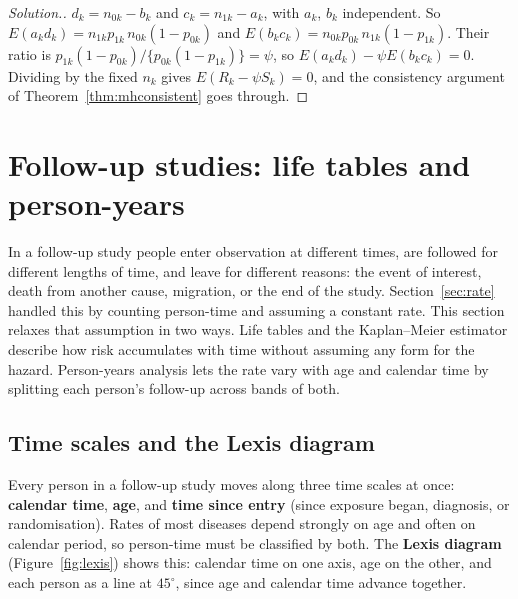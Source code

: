 \documentclass[11pt,a4paper]{article}
\numberwithin{equation}{section}
\theoremstyle{definition}
\newenvironment{solution}
  {\renewcommand{\qedsymbol}{}\begin{proof}[\textit{Solution}.]}
  {\end{proof}}
\begin{document}
\begin{solution}
$d_k = n_{0k} - b_k$ and $c_k = n_{1k} - a_k$, with $a_k$, $b_k$ independent. So $E(a_k d_k) = n_{1k}p_{1k}\,n_{0k}(1 - p_{0k})$ and $E(b_k c_k) = n_{0k}p_{0k}\,n_{1k}(1 - p_{1k})$. Their
ratio is $p_{1k}(1 - p_{0k})/\{p_{0k}(1 - p_{1k})\} = \psi$, so $E(a_k d_k) - \psi E(b_k c_k) = 0$. Dividing by the fixed $n_k$ gives $E(R_k - \psi S_k) = 0$, and the consistency argument
of Theorem~\ref{thm:mhconsistent} goes through.
\end{solution}

\section{Follow-up studies: life tables and person-years}
\label{sec:followup}

In a follow-up study people enter observation at different times, are followed for different lengths of time, and leave for different
reasons: the event of interest, death from another cause, migration, or the end of the study. Section~\ref{sec:rate} handled this by
counting person-time and assuming a constant rate. This section relaxes that assumption in two ways. Life tables and the Kaplan--Meier
estimator describe how risk accumulates with time without assuming any form for the hazard. Person-years analysis lets the rate vary
with age and calendar time by splitting each person's follow-up across bands of both.

\subsection{Time scales and the Lexis diagram}

Every person in a follow-up study moves along three time scales at once: \textbf{calendar time}, \textbf{age}, and \textbf{time since entry}
(since exposure began, diagnosis, or randomisation). Rates of most diseases depend strongly on age and often on calendar period, so
person-time must be classified by both. The \textbf{Lexis diagram} (Figure~\ref{fig:lexis}) shows this: calendar time on one axis, age on
the other, and each person as a line at $45^\circ$, since age and calendar time advance together.
\end{document}
